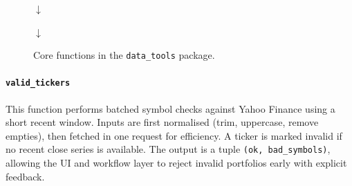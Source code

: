 \begin{figure}[htbp]
    \centering
    \setlength{\fboxsep}{8pt}

    \vspace{6pt}

    \noindent
    \hspace{0.03\textwidth}%

    \vspace{6pt}

    {\Large $\downarrow$}

    \vspace{2pt}


    \vspace{6pt}


    \vspace{4pt}

    {\Large $\downarrow$}

    \vspace{4pt}

    \caption{Core functions in the \texttt{data\_tools} package.}
\end{figure}

\paragraph{\texttt{valid\_tickers}}
This function performs batched symbol checks against Yahoo Finance using a short recent window. Inputs are first normalised (trim, uppercase, remove empties), then fetched in one request for efficiency. A ticker is marked invalid if no recent close series is available. The output is a tuple \texttt{(ok, bad\_symbols)}, allowing the UI and workflow layer to reject invalid portfolios early with explicit feedback.

